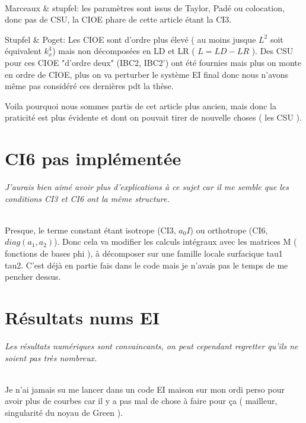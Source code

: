 \documentclass{article}
\newenvironment{REM}{\itshape}{}
\newenvironment{REP}{~{}\\}{}
\begin{document}
\begin{REP}
    Marceaux \& stupfel: les paramètres sont issus de Taylor, Padé ou colocation, donc pas de CSU, la CIOE phare de cette article étant la CI3.

    Stupfel \& Poget: Les CIOE sont d'ordre plus élevé ( au moins jusque \(L^2\) soit équivalent \(k_x^4\)) mais non décomposées en LD et LR ( \(L = LD - LR\) ). 
    Des CSU pour ces CIOE "d'ordre deux" (IBC2, IBC2') ont été fournies mais plus on monte en ordre de CIOE, plus on va perturber le système EI final donc nous n’avons même pas considéré ces dernières pdt la thèse.

    Voila pourquoi nous sommes partis de cet article plus ancien, mais donc la praticité est plus évidente et dont on pouvait tirer de nouvelle choses ( les CSU ).
\end{REP}

\section{CI6 pas implémentée}
\begin{REM}
    J’aurais bien aimé avoir plus d’explications à ce sujet car il me semble que les conditions CI3 et CI6 ont la même structure.
\end{REM}

\begin{REP}
    Presque, le terme constant étant isotrope (CI3, \(a_0 I\)) ou orthotrope (CI6, \(diag(a_1,a_2)\)).
    Donc cela va modifier les calculs intégraux avec les matrices M ( fonctions de bases phi ), à décomposer sur une famille locale surfacique tau1 tau2.
    C'est déjà en partie fais dans le code mais je n'avais pas le temps de me pencher dessus.
\end{REP}

\section{Résultats nums EI}
\begin{REM}
    Les résultats numériques sont convaincants, on peut cependant regretter qu’ils ne soient pas très nombreux.
\end{REM}

\begin{REP}
    Je n'ai jamais su me lancer dans un code EI maison sur mon ordi perso pour avoir plus de courbes car il y a pas mal de chose à faire pour ça ( mailleur, singularité du noyau de Green ).
\end{REP}
\end{document}
